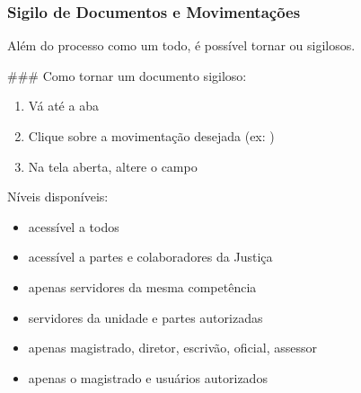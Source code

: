 \documentclass[letterpaper,10pt,brazil]{sphinxmanual}
\begin{document}
\subsubsection{Sigilo de Documentos e Movimentações}
\label{\detokenize{projud_13_alterarsigilo:sigilo-de-documentos-e-movimentacoes}}
\sphinxAtStartPar
Além do processo como um todo, é possível tornar  ou  sigilosos.

\sphinxAtStartPar
\#\#\# Como tornar um documento sigiloso:
\begin{enumerate}
%
\item {} 
\sphinxAtStartPar
Vá até a aba 

\item {} 
\sphinxAtStartPar
Clique sobre a movimentação desejada (ex: )

\item {} 
\sphinxAtStartPar
Na tela aberta, altere o campo 

\end{enumerate}

\sphinxAtStartPar
Níveis disponíveis:
\begin{itemize}
\item {} 
\sphinxAtStartPar
{} \textendash{} acessível a todos

\item {} 
\sphinxAtStartPar
{} \textendash{} acessível a partes e colaboradores da Justiça

\item {} 
\sphinxAtStartPar
{} \textendash{} apenas servidores da mesma competência

\item {} 
\sphinxAtStartPar
{} \textendash{} servidores da unidade e partes autorizadas

\item {} 
\sphinxAtStartPar
{} \textendash{} apenas magistrado, diretor, escrivão, oficial, assessor

\item {} 
\sphinxAtStartPar
{} \textendash{} apenas o magistrado e usuários autorizados

\end{itemize}
\end{document}
